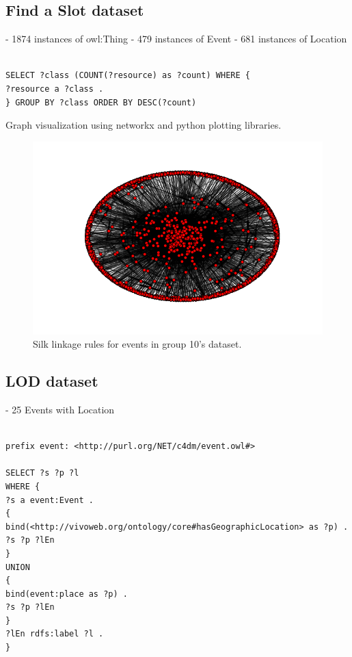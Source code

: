 \documentclass[runningheads,a4paper]{../../StyleFiles/llncs}
\begin{document}
\subsection{Find a Slot dataset}
- 1874 instances of owl:Thing
- 479 instances of Event
- 681 instances of Location

\begin{lstlisting}[captionpos=b, caption=SPARQL query for counting resources per class, label=lst:sparql, basicstyle=\ttfamily\small,frame=bt]

SELECT ?class (COUNT(?resource) as ?count) WHERE {
?resource a ?class . 
} GROUP BY ?class ORDER BY DESC(?count)

\end{lstlisting}

Graph visualization using networkx and python plotting libraries. 

\begin{figure}[h]
	\centering
	\includegraphics[width=1\textwidth]{img/findaslot_network_graph.png}
	\caption{Silk linkage rules for events in group 10's dataset.}
	\label{fig:link_event_g10}
\end{figure}

\subsection{LOD dataset}
- 25 Events with Location

\begin{lstlisting}[captionpos=b, caption=SPARQL query for getting Event with Location, label=lst:sparql, basicstyle=\ttfamily\small,frame=bt]

prefix event: <http://purl.org/NET/c4dm/event.owl#>

SELECT ?s ?p ?l
WHERE {
?s a event:Event .
{ 
bind(<http://vivoweb.org/ontology/core#hasGeographicLocation> as ?p) .
?s ?p ?lEn
}
UNION
{ 
bind(event:place as ?p) .
?s ?p ?lEn
}
?lEn rdfs:label ?l .
}

\end{lstlisting}
\end{document}
